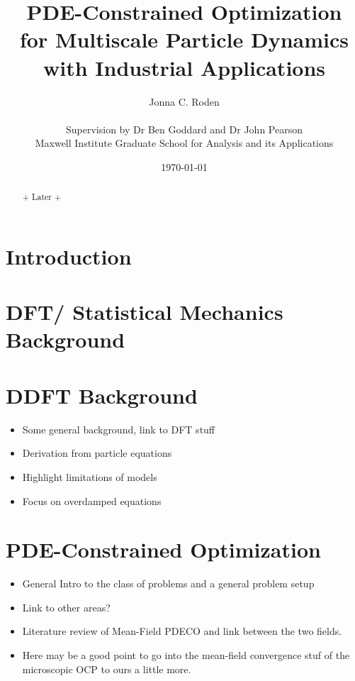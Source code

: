 \documentclass[11pt, a4paper]{article}
\title{{\huge PDE-Constrained Optimization \\for Multiscale Particle Dynamics} \\ with Industrial Applications}
\author{Jonna C. Roden\\ \\Supervision by Dr Ben Goddard and Dr John Pearson\\ \vspace{0.5cm} Maxwell Institute Graduate School for Analysis and its Applications}
\date{\today}
\theoremstyle{definition}
\begin{document}
	\maketitle
\begin{abstract}
+ Later +
	
\end{abstract}

\newpage
{} 
\tableofcontents
\newpage
{} 

	
	
	\section{Introduction}
	
	\section{DFT/ Statistical Mechanics Background}
	
	\section{DDFT Background}
		\begin{itemize}
			\item Some general background, link to DFT stuff
			\item Derivation from particle equations
			\item Highlight limitations of models
			\item Focus on overdamped equations
		\end{itemize}

	\section{PDE-Constrained Optimization}
		\begin{itemize}
			\item General Intro to the class of problems and a general problem setup
			\item Link to other areas?
			\item Literature review of Mean-Field PDECO and link between the two fields.
			\item Here may be a good point to go into the mean-field convergence stuf of the microscopic OCP to ours a little more.
		\end{itemize}
	
\end{document}

